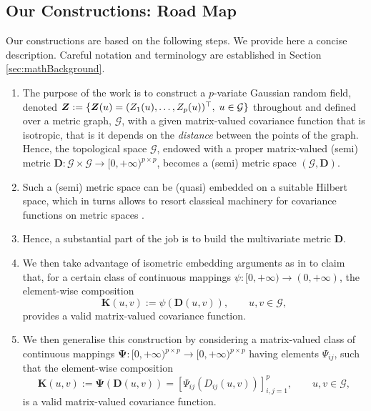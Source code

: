 \documentclass[12pt]{article}
\theoremstyle{plain}
\theoremstyle{remark}
\newcommand{\latMatr}[1]{\mathbf{#1}}          %
\newcommand{\grMatr}[1]{{\boldsymbol{#1}}}   %
\newcommand{\rVec}[1]{{\bm{#1}}}            %
\begin{document}
\subsection{Our Constructions: Road Map}
    Our constructions are based on the following steps. We provide here a concise description. Careful notation and terminology are established in Section \ref{sec:mathBackground}.\par
    \begin{enumerate}
        \item The purpose of the work is to construct a $p$-variate Gaussian {random field}, denoted $\rVec{Z}:= \{ \rVec{Z}(u)=(Z_1(u),\ldots,Z_p(u))^{\top}, \; u \in {\cal G} \}$ throughout and defined over a metric graph, $\mathcal G$, with a given matrix-valued covariance function that is isotropic, that is it depends on the {\em distance} between the points of the graph. Hence, the topological space $\mathcal G$, endowed with a proper matrix-valued (semi) metric $\latMatr D: \mathcal G \times \mathcal G \to [0,+\infty)^{p \times p}$, becomes a (semi) metric space $(\mathcal G, \latMatr D)$. 
        \item Such a (semi) metric space can be (quasi) embedded on a suitable Hilbert space, which in turns allows to resort classical machinery for covariance functions on metric spaces \citep{schoenberg}.
        \item Hence, a substantial part of the job is to build the multivariate metric $\latMatr D$.
        \item We then take advantage of isometric embedding arguments as in \cite{anderes_isotropic_2020} to claim that, for a certain class of continuous mappings $\psi: [0,+\infty) \to (0,+\infty)$, the {element-wise} composition
        \begin{equation} 
            \label{eq:covariance_general}
            \latMatr K(u,v):= \psi \left ( \latMatr D(u,v) \right ), \qquad u,v \in \mathcal G, 
        \end{equation}
        provides a valid matrix-valued covariance function.
        \item We then generalise this construction by considering a matrix-valued class of continuous mappings $\grMatr{\Psi}:{[0,+\infty)}^{p \times p  } \to {[0,+\infty)}^{p \times p}$ having elements $\Psi_{ij}$, such that the {element-wise} composition 
        \begin{equation} 
            \label{eq:covariance_general_2}
            \latMatr{K}(u,v):= \grMatr{\Psi} \left ( \latMatr{D}(u,v) \right ) = \left  [ \Psi_{ij}(D_{ij}(u,v)) \right ]_{i,j=1}^p, \qquad u,v \in \mathcal G, 
        \end{equation}
        is a valid matrix-valued covariance function.
    \end{enumerate} 
\end{document}
